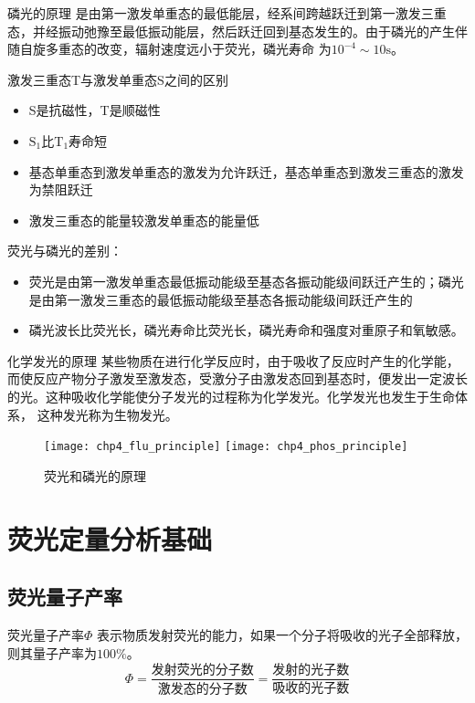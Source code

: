 \begin{definition*}{磷光的原理}
	是由第一激发单重态的最低能层，经系间跨越跃迁到第一激发三重态，并经振动弛豫至最低振动能层，然后跃迁回到基态发生的。由于磷光的产生伴随自旋多重态的改变，辐射速度远小于荧光，磷光寿命 为$10^{-4}\sim 10 \mathrm{s}$。%
\end{definition*}
激发三重态T与激发单重态S之间的区别
\begin{itemize}
	\item S是抗磁性，T是顺磁性
	\item $\mathrm{S}_1$比$\mathrm{T}_1$寿命短
	\item 基态单重态到激发单重态的激发为允许跃迁，基态单重态到激发三重态的激发为禁阻跃迁
	\item 激发三重态的能量较激发单重态的能量低
\end{itemize}
\begin{note}
	荧光与磷光的差别：
	\begin{itemize}
		\item 荧光是由第一激发单重态最低振动能级至基态各振动能级间跃迁产生的；磷光是由第一激发三重态的最低振动能级至基态各振动能级间跃迁产生的
		\item 磷光波长比荧光长，磷光寿命比荧光长，磷光寿命和强度对重原子和氧敏感。
	\end{itemize}
\end{note}
\begin{definition*}{化学发光的原理}
	某些物质在进行化学反应时，由于吸收了反应时产生的化学能，而使反应产物分子激发至激发态，受激分子由激发态回到基态时，便发出一定波长的光。这种吸收化学能使分子发光的过程称为化学发光。化学发光也发生于生命体系， 这种发光称为生物发光。
\end{definition*}
\begin{figure}[!h]
	\centering
	\texttt{[image: chp4\_flu\_principle]}
	\label{fig:chp4fluprinciple}
	\texttt{[image: chp4\_phos\_principle]}
	\label{fig:chp4phosprinciple}
	\caption{荧光和磷光的原理}
\end{figure}



\section{荧光定量分析基础}
\subsection{荧光量子产率}

\begin{definition*}{荧光量子产率$\Phi$}{}
	 表示物质发射荧光的能力，如果一个分子将吸收的光子全部释放，则其量子产率为$100\%$。
	\begin{equation*}
		\Phi =\frac{\text{发射荧光的分子数}}{\text{激发态的分子数}}=\frac{\text{发射的光子数}}{\text{吸收的光子数}}
	\end{equation*}
\end{definition*}

